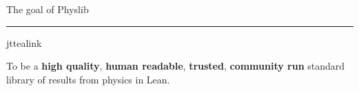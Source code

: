 \documentclass[aspectratio=169,10pt]{beamer}
\begin{document}
\begin{frame}{The goal of Physlib}
  \vfill
  {\color{jttealink}\rule{2.4cm}{1.8pt}}\par
  \vspace{14pt}
  \begin{jtquote}[top=16pt,bottom=16pt]{jttealink}
    {\fontsize{21}{29}\selectfont\color{jtslate}%
      To be a {\bfseries high quality}, {\bfseries human readable},
      {\bfseries trusted}, {\bfseries community run} standard library of
      results from physics in Lean.\par}
  \end{jtquote}
  \vfill
\end{frame}
\end{document}
